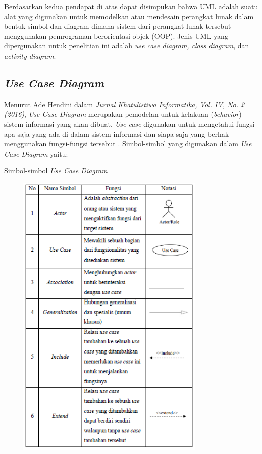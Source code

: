 Berdasarkan kedua pendapat di atas dapat disimpukan bahwa UML adalah suatu alat yang digunakan untuk memodelkan atau mendesain perangkat lunak dalam bentuk simbol dan diagram dimana sistem dari perangkat lunak tersebut menggunakan pemrograman berorientasi objek (OOP). Jenis UML yang dipergunakan untuk penelitian ini adalah \textit{use case diagram, class diagram}, dan \textit{activity diagram}. 

\subsection{\emph{Use Case Diagram}} 

Menurut Ade Hendini dalam \textit{Jurnal Khatulistiwa Informatika, Vol. IV, No. 2 (2016)}, \textit{Use Case Diagram }merupakan pemodelan untuk kelakuan (\textit{behavior}) sistem informasi yang akan dibuat. \textit{Use case} digunakan untuk mengetahui fungsi apa saja yang ada di dalam sistem informasi dan siapa saja yang berhak menggunakan fungsi-fungsi tersebut \cite{AdeHendini}. Simbol-simbol yang digunakan dalam \textit{Use Case Diagram} yaitu:

\begin{table}[H]
	\centering
	\caption{Simbol-simbol \emph{Use Case Diagram} \cite{AdeHendini}}
	\includegraphics[width=11cm,height=14cm]{gambar/simbolusecase}
	\label{simbolusecase}
\end{table}


